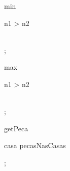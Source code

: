 \begin{op}[e]{min}%
\signature{\Nat  \X \Nat  \Oto \Nat }
\begin{blockstmt}
\If n1 > n2
\Then \\
\Else \\
\Fi
\end{blockstmt};
\end{op}
\begin{op}[e]{max}%
\signature{\Nat  \X \Nat  \Oto \Nat }
\begin{blockstmt}
\If n1 > n2
\Then \\
\Else \\
\Fi
\end{blockstmt};
\end{op}
\begin{op}[e]{getPeca}%
\signature{Casa \Oto Peca}
\begin{precond}
casa \In  \Dom pecasNasCasas
\end{precond};
\end{op}
